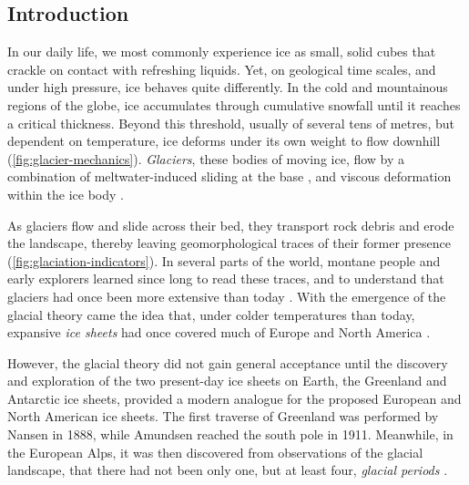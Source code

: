 \documentclass[a4paper]{kappa}
\begin{document}
\begin{multicols}{2}  %

\section{Introduction}

In our daily life, we most commonly experience ice as small, solid cubes
that crackle on contact with refreshing liquids. Yet, on geological
time scales, and under high pressure, ice behaves quite differently.
In the cold and mountainous regions of the globe, ice accumulates through
cumulative snowfall until it reaches a critical thickness. Beyond this
threshold, usually of several tens of metres, but dependent on temperature, ice
deforms under its own weight to flow downhill (\cref{fig:glacier-mechanics}).
\emph{Glaciers}, these bodies of moving ice, flow by a combination of
meltwater-induced sliding at the base \citep[\S532]{Saussure.1786},
and viscous deformation within the
ice body \citep{Forbes.1846b}.

As glaciers flow and slide across their bed, they transport
rock debris and erode the landscape, thereby leaving geomorphological traces of
their former presence (\cref{fig:glaciation-indicators}). In several parts of
the world, montane people
and early explorers learned since long to read these traces, and to
understand that glaciers had once been more extensive than today
\citep[e.g.,][p.~21]{Windham.Martel.1744}. With the emergence of the glacial
theory came the idea that, under colder temperatures
than today, expansive \emph{ice sheets} had once covered much of Europe and
North America \citep{Agassiz.1840}.

However, the glacial theory did not gain general acceptance until the
discovery and exploration
of the two present-day ice sheets on Earth, the Greenland and
Antarctic ice sheets, provided a modern analogue for the proposed European and
North American ice sheets. The first traverse of Greenland was performed by
Nansen in 1888, while Amundsen reached the south pole in 1911. Meanwhile, in
the European Alps, it was then discovered from observations of the glacial
landscape, that there had not been only one, but at least four, \emph{glacial
periods} \citep{Penck.Bruckner.1909}.

\end{multicols}
\twocolumn
\end{document}
